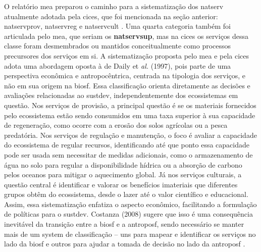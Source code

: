 \documentclass[./main.tex]{subfiles}
\begin{document}
\par O relatório \acrshort{mea} preparou o caminho para a sistematização dos \gls{natserv} atualmente adotada pela \acrfull{cices}, que foi mencionada na seção anterior: \gls{natservprov}, \gls{natservreg} e \gls{natservcult} \cite{Haines-young2018a}. Uma quarta categoria também foi articulada pelo \acrshort{mea}, que seriam os \textbf{\gls{natservsup}}, mas na \acrshort{cices} os serviços dessa classe foram desmembrados ou mantidos conceitualmente como processos precursores dos serviços em si. A sistematização proposta pelo \acrshort{mea} e pela \acrshort{cices} adota uma abordagem oposta à de Daily et \textit{al.} (1997), pois parte de uma perspectiva econômica e antropocêntrica, centrada na tipologia dos serviços, e não em sua origem na \gls{biosf}. Essa classificação orienta diretamente as decisões e avaliações relacionadas ao \gls{sustdev}, independentemente dos ecossistemas em questão. Nos serviços de provisão, a principal questão é se os materiais fornecidos pelo ecossistema estão sendo consumidos em uma taxa superior à sua capacidade de regeneração, como ocorre com a erosão dos solos agrícolas ou a pesca predatória. Nos serviços de regulação e manutenção, o foco é avaliar a capacidade do ecossistema de regular recursos, identificando até que ponto essa capacidade pode ser usada sem necessitar de medidas adicionais, como o armazenamento de água no solo para regular a disponibilidade hídrica ou a absorção de carbono pelos oceanos para mitigar o aquecimento global. Já nos serviços culturais, a questão central é identificar e valorar os benefícios imateriais que diferentes grupos obtêm do ecossistema, desde o lazer até o valor científico e educacional. Assim, essa sistematização enfatiza o aspecto econômico, facilitando a formulação de políticas para o \gls{sustdev}. Costanza (2008) sugere que isso é uma consequência inevitável da transição entre a \gls{biosf} e a \gls{antroposf}, sendo necessário se manter mais de um \gls{system} de classificação -- uns para mapear e identificar os serviços no lado da \gls{biosf} e outros para ajudar a tomada de decisão no lado da \gls{antroposf} \cite{costanza2008}.
\end{document}
